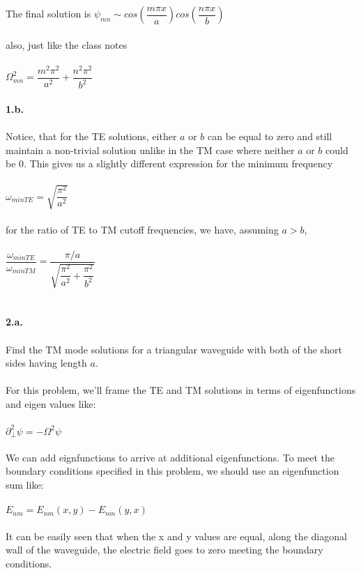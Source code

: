 \documentclass[prb,preprint]
{revtex4-1}
\newcommand{\PRLsep}{\noindent\makebox[\linewidth]{\resizebox{0.8888\linewidth}{2pt}{$\bullet$}}\bigskip}
\begin{document}
The final solution is 
$\psi_{mn} \sim cos\left(\dfrac{m\pi x}{a}\right)cos\left(\dfrac{n\pi x}{b}\right)$
\\
\\
also, just like the class notes
\\
\\
$\Omega^2_{mn} = \dfrac{m^2\pi^2}{a^2} + \dfrac{n^2\pi^2}{b^2}$
\\
\\
\textbf{1.b.}
\\
\\
Notice, that for the TE solutions, either $a$ or $b$ can be equal to zero and still maintain a non-trivial solution unlike in the TM case where neither $a$ or $b$ could be 0.  This gives us a slightly different expression for the minimum frequency 
\\
\\
$\omega_{minTE} = \sqrt{\dfrac{\pi^2}{a^2}}$
\\
\\
for the ratio of TE to TM cutoff frequencies, we have, assuming $a > b$,
\\
\\
$\dfrac{\omega_{minTE}}{\omega_{minTM}} = \dfrac{\pi/a}{\sqrt{\dfrac{\pi^2}{a^2} + \dfrac{\pi^2}{b^2}}}$
\\
\\
\PRLsep
\\
\newpage
\textbf{2.a.}
\\
\\
Find the TM mode solutions for a triangular waveguide with both of the short sides having length $a$.
\\
\\
For this problem, we'll frame the TE and TM solutions in terms of eigenfunctions and eigen values like:
\\
\\
$\partial_\perp^2 \psi = -\Omega^2 \psi$
\\
\\
We can add eignfunctions to arrive at additional eigenfunctions.  To meet the boundary conditions specified in this problem, we should use an eigenfunction sum like:
\\
\\
$E_{nm} = E_{nm}\left(x,y\right) - E_{nm}\left(y,x\right)$
\\
\\
It can be easily seen that when the x and y values are equal, along the diagonal wall of the waveguide, the electric field goes to zero meeting the boundary conditions.
\end{document}
